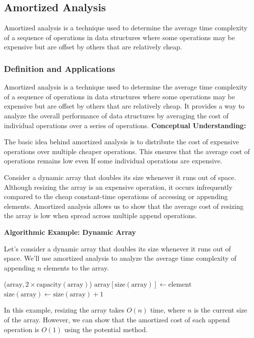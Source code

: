 \documentclass[12pt]{book} %
\begin{document}
\subsection{Amortized Analysis}

Amortized analysis is a technique used to determine the average time complexity of a sequence of operations in data structures where some operations may be expensive but are offset by others that are relatively cheap.

\subsubsection{Definition and Applications}

Amortized analysis is a technique used to determine the average time complexity of a sequence of operations in data structures where some operations may be expensive but are offset by others that are relatively cheap. It provides a way to analyze the overall performance of data structures by averaging the cost of individual operations over a series of operations.
\FloatBarrier
\textbf{Conceptual Understanding:}
\FloatBarrier

The basic idea behind amortized analysis is to distribute the cost of expensive operations over multiple cheaper operations. This ensures that the average cost of operations remains low even If some individual operations are expensive. 

Consider a dynamic array that doubles its size whenever it runs out of space. Although resizing the array is an expensive operation, it occurs infrequently compared to the cheap constant-time operations of accessing or appending elements. Amortized analysis allows us to show that the average cost of resizing the array is low when spread across multiple append operations.

\FloatBarrier
\textbf{Algorithmic Example: Dynamic Array}
\FloatBarrier

Let's consider a dynamic array that doubles its size whenever it runs out of space. We'll use amortized analysis to analyze the average time complexity of appending \(n\) elements to the array.
\FloatBarrier
\begin{algorithm}
\caption{Append Operation on Dynamic Array}
\begin{algorithmic}[1]
        \State {}($\text{array}, 2 \times \text{capacity}(\text{array})$)
    \EndIf
    \State $\text{array}[\text{size}(\text{array})] \gets \text{element}$
    \State $\text{size}(\text{array}) \gets \text{size}(\text{array}) + 1$
\EndFunction
\end{algorithmic}
\end{algorithm}
\FloatBarrier
In this example, resizing the array takes \(O(n)\) time, where \(n\) is the current size of the array. However, we can show that the amortized cost of each append operation is \(O(1)\) using the potential method.
\end{document}

